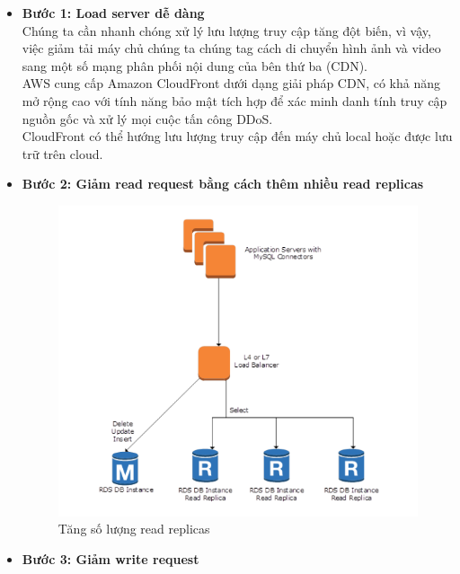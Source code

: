 \begin{itemize}
    \item \textbf{Bước 1: Load server dễ dàng}\\[0.2cm]
        Chúng ta cần nhanh chóng xử lý lưu lượng truy cập tăng đột biến, vì vậy, việc giảm tải máy chủ chúng ta chúng tag cách di chuyển hình ảnh và video sang một số mạng phân phối nội dung của bên thứ ba (CDN). \\[0.5cm]
        AWS cung cấp Amazon CloudFront dưới dạng giải pháp CDN, có khả năng mở rộng cao với tính năng bảo mật tích hợp để xác minh danh tính truy cập nguồn gốc và xử lý mọi cuộc tấn công DDoS. \\[0.5cm]
        CloudFront có thể hướng lưu lượng truy cập đến máy chủ local hoặc được lưu trữ trên cloud.
    \item \textbf{Bước 2: Giảm read request bằng cách thêm nhiều read replicas}
        \begin{figure}[H]
            \begin{center}
            \includegraphics[scale=1]{images/hieu/chap-2/read-replica.png}
            \vspace*{5mm}
            \caption{Tăng số lượng read replicas}
            \end{center}
        \end{figure} 
    \item \textbf{Bước 3: Giảm write request}
        \begin{figure}[H]
            \begin{center}

\end{center}
\end{figure}
\end{itemize}
